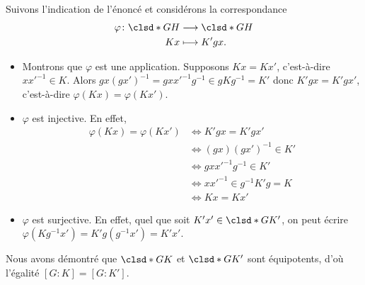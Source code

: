 Suivons l'indication de l'énoncé et considérons la correspondance
%
\begin{align*}
  \varphi\colon\clsd*{G}{H} &\longrightarrow\clsd*{G}{H} \\
                        Kx &\longmapsto K'gx.
\end{align*}
%
\begin{itemize}
  \item
    Montrons que $\varphi$ est une application. Supposons $Kx = Kx'$,
    c'est-à-dire $xx'^{-1}\in K$. Alors
    $gx(gx')^{-1} = gxx'^{-1}g^{-1} \in gKg^{-1} = K'$ donc $K'gx=K'gx'$,
    c'est-à-dire $\varphi(Kx)=\varphi(Kx')$.

  \item
    $\varphi$ est injective. En effet,
    \begin{align*}
      \varphi(Kx) = \varphi(Kx')
        &\iff K'gx = K'gx'\\
        &\iff (gx)(gx')^{-1} \in K'\\
        &\iff gxx'^{-1}g^{-1} \in K'\\
        &\iff xx'^{-1} \in g^{-1}K'g = K\\
        &\iff Kx = Kx'
    \end{align*}
  \item
    $\varphi$ est surjective. En effet, quel que soit
    $K'x' \in \clsd*{G}{K'}$, on peut écrire
    $\varphi(Kg^{-1}x') = K'g(g^{-1}x') = K'x'$.
\end{itemize}

Nous avons démontré que $\clsd*{G}{K}$ et $\clsd*{G}{K'}$ sont équipotents, d'où
l'égalité $[G:K]=[G:K']$.
